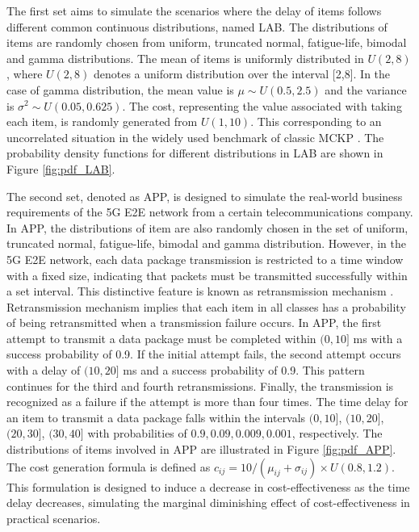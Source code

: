 \documentclass[lettersize,journal]{IEEEtran}
\begin{document}
The first set aims to simulate the scenarios where the delay of items follows different common continuous distributions, named LAB. 
The distributions of items are randomly chosen from uniform, truncated normal, fatigue-life, bimodal and gamma distributions.
The mean of items is uniformly distributed in $U(2,8)$, where $U(2, 8)$ denotes a uniform distribution
over the interval [2,8].
In the case of gamma distribution, the mean value is $\mu\sim U(0.5,2.5)$ and the variance is $\sigma^2\sim U(0.05,0.625)$.
The cost, representing the value associated with taking each item, is randomly generated from $U(1,10)$. 
This corresponding to an uncorrelated situation in the widely used benchmark of classic MCKP  \cite{mkaouar2020solving}. 
The probability density functions for different distributions in LAB are shown in Figure \ref{fig:pdf_LAB}.

The second set, denoted as APP, is designed to simulate the real-world business requirements of the 5G E2E network from a certain telecommunications company. 
In APP, the distributions of item are also randomly chosen in the set of uniform, truncated normal, fatigue-life, bimodal and gamma distribution.
However, in the 5G E2E network, each data package transmission is restricted to a time window with a fixed size, indicating that packets must be transmitted successfully within a set interval.
This distinctive feature is known as retransmission mechanism \cite{nasrallah2018ultra}. 
Retransmission mechanism implies that each item in all classes has a probability of being retransmitted when a transmission failure occurs.
In APP, the first attempt to transmit a data package must be completed within $(0,10]$ ms with a success probability of 0.9. 
If the initial attempt fails, the second attempt occurs with a delay of $(10,20]$ ms and a success probability of 0.9. 
This pattern continues for the third and fourth retransmissions. 
Finally, the transmission is recognized as a failure if the attempt is more than four times. 
The time delay for an item to transmit a data package falls within the intervals $(0,10]$, $(10,20]$, $(20,30]$, $(30,40]$ with probabilities of $0.9, 0.09, 0.009, 0.001$, respectively. 
The distributions of items involved in APP are illustrated in Figure \ref{fig:pdf_APP}.
The cost generation formula is defined as $c_{ij}=10/(\mu_{ij}+\sigma_{ij} )\times U(0.8,1.2)$. 
This formulation is designed to induce a decrease in cost-effectiveness as the time delay decreases, simulating the marginal diminishing effect of cost-effectiveness in practical scenarios.
\end{document}

